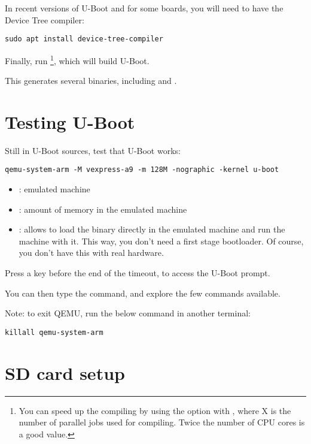 In recent versions of U-Boot and for some boards, you will
need to have the Device Tree compiler:

\begin{verbatim}
sudo apt install device-tree-compiler
\end{verbatim}

Finally, run \footnote{You can speed up the
compiling by using the  option with , where X
is the number of parallel jobs used for compiling. Twice the
number of CPU cores is a good value.}, which will build U-Boot.


This generates several binaries, including  and
.

\section{Testing U-Boot}

Still in U-Boot sources, test that U-Boot works:

\begin{verbatim}
qemu-system-arm -M vexpress-a9 -m 128M -nographic -kernel u-boot
\end{verbatim}

\begin{itemize}
\item {}: emulated machine
\item {}: amount of memory in the emulated machine
\item {}: allows to load the binary directly in the emulated
      machine and run the machine with it. This way, you don't
      need a first stage bootloader. Of course, you don't
      have this with real hardware.
\end{itemize}

Press a key before the end of the timeout, to access the U-Boot prompt.

You can then type the  command, and explore the few commands
available.

Note: to exit QEMU, run the below command in another terminal:

\begin{verbatim}
killall qemu-system-arm
\end{verbatim}

\section{SD card setup}

